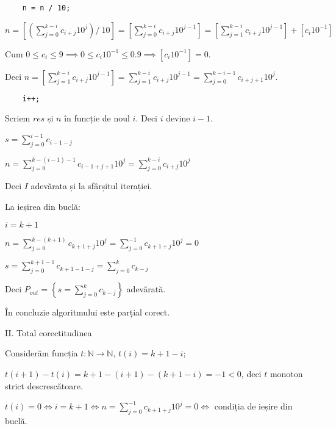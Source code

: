 \documentclass[11pt]{article}
\begin{document}
\begin{verbatim}
    n = n / 10;
\end{verbatim}

$n = \left[ \left( \sum\limits_{j=0}^{k-i}c_{i+j}10^{j} \right) / \ 10 \right]
= \left[ \sum\limits_{j=0}^{k-i}c_{i+j}10^{j-1} \right]
= \left[ \sum\limits_{j=1}^{k-i}c_{i+j}10^{j-1} \right] + \left[c_{i}10^{-1} \right]
$

Cum $0 \le c_{i} \le 9 \implies 0 \le c_{i}10^{-1} \le 0.9 \implies \left[c_{i}10^{-1} \right] = 0$.

Deci $n = \left[ \sum\limits_{j=1}^{k-i}c_{i+j}10^{j-1} \right] = \sum\limits_{j=1}^{k-i}c_{i+j}10^{j-1} = \sum\limits_{j=0}^{k-i-1}c_{i+j+1}10^{j}$. 

\begin{verbatim}
    i++;
\end{verbatim}

Scriem $\mathit{res}$ și $n$ în funcție de noul $i$. Deci $i$ devine $i-1$.


$s = \sum\limits_{j=0}^{i-1}c_{i-1-j}$

$n = \sum\limits_{j=0}^{k-(i-1)-1}c_{i-1+j+1}10^{j} = \sum\limits_{j=0}^{k-i}c_{i+j}10^{j} $

Deci $I$ adevărata și la sfârșitul iterației.


\vspace{14pt}
La ieșirea din buclă:

$i = k + 1$

$n = \sum\limits_{j=0}^{k-(k+1)}c_{k+1+j}10^{j}
= \sum\limits_{j=0}^{-1}c_{k+1+j}10^{j} = 0$

$s = \sum\limits_{j=0}^{k+1-1}c_{k+1-1-j}
= \sum\limits_{j=0}^{k}c_{k-j}$

Deci $P_{out} = \left\{ s = \sum\limits_{j=0}^{k} c_{k-j} \right\} $ adevărată.

În concluzie algoritmului este parțial corect.

\vspace{14pt}
\noindent
II. Total corectitudinea
\newline

Considerăm funcția $t: \mathbb{N} \to \mathbb{N}$, $t(i) = k + 1 - i$;

$t(i + 1) - t(i) = k + 1 - (i + 1) - (k + 1 - i) = -1 < 0$, deci $t$ monoton strict descrescătoare.

$t(i) = 0 \iff i = k + 1 \iff n = \sum\limits_{j=0}^{-1}c_{k+1+j}10^{j} = 0\iff$ condiția de ieșire din buclă.
\end{document}
